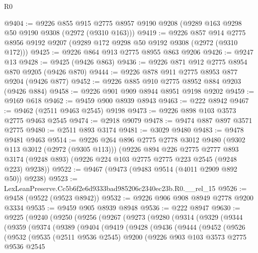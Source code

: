\begin{lexlean}{R0}
\begin{coremodule}
@9404 := @9226
    @855
    @915
    @2775
    @8957
    @9190
    @9208
    (@9289 @163 @9298 @50 @9190 @9308 (@2972 (@9310 @163)))
@9419 := @9226
    @857
    @914
    @2775
    @8956
    @9192
    @9207
    (@9289 @172 @9298 @50 @9192 @9308 (@2972 (@9310 @172)))
@9425 := @9226 @864 @913 @2775 @8955 @863 @9206
@9426 := @9247 @13
@9428 := @9425 (@9426 @863)
@9436 := @9226 @871 @912 @2775 @8954 @870 @9205 (@9426 @870)
@9444 := @9226 @878 @911 @2775 @8953 @877 @9204 (@9426 @877)
@9452 := @9226 @885 @910 @2775 @8952 @884 @9203 (@9426 @884)
@9458 := @9226 @901 @909 @8944 @8951 @9198 @9202
@9459 := @9169 @618
@9462 := @9459 @900 @8939 @8943
@9463 := @222 @8942
@9467 := @9462 (@2511 @9463 @2545) @9198
@9473 := @9226 @898 @103 @3573 @2775 @9463 @2545
@9474 := @2918 @9079
@9478 := @9474 @887 @897 @3571 @2775
@9480 := @2511 @893 @3174
@9481 := @3029 @9480
@9483 := @9478 @9481 @9463
@9514 := @9226
    @264
    @896
    @2775
    @2778
    @3012
    @9480
    (@9302 @113 @3012 (@2972 (@9305 @113)))
    (@9226
      @894
      @226
      @2775
      @2777
      @893
      @3174
      (@9248 @893)
      (@9226 @224 @103 @2775 @2775 @223 @2545 (@9248 @223) @9238))
@9522 := @9467 (@9473 (@9483 @9514 (@4011 @2909 @892 @50)) @9238)
@9523 := LexLeanPreserve.Cc5b6f2e6d9333bad985206c2340ec23b.R0.__rel_15
@9526 := @9458 (@9522 (@9523 @8942))
@9532 := @9226 @906 @908 @8949 @2778 @9200 @3334
@9535 := @9459 @905 @8939 @8948
@9536 := @222 @8947
@9630 := @9225
    (@9240
      (@9250
        (@9256
          (@9267
            (@9273
              (@9280
                (@9314
                  (@9329
                    (@9344
                      (@9359
                        (@9374
                          (@9389
                            (@9404
                              (@9419
                                (@9428
                                  (@9436
                                    (@9444
                                      (@9452
                                        (@9526
                                          (@9532
                                            (@9535
                                              (@2511 @9536 @2545)
                                              @9200
                                              (@9226
                                                @903
                                                @103
                                                @3573
                                                @2775
                                                @9536
                                                @2545

\end{coremodule}
\end{lexlean}
